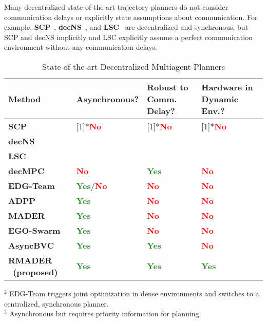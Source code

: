 Many decentralized state-of-the-art trajectory planners do not consider communication delays or explicitly state assumptions about communication. 
For example, \textbf{SCP}~\cite{chen_decoupled_2015}, \textbf{decNS}~\cite{liu_towards_2018}, and \textbf{LSC}~\cite{park_online_2022} are decentralized and synchronous, but SCP and decNS implicitly and LSC explicitly assume a perfect communication environment without any communication delays.

\newcommand{\NoRed}{\textbf{\textcolor{red}{No}}}
\newcommand{\YesGreen}{\textbf{\textcolor{ForestGreen}{Yes}}}

\begin{table}[!t]
    \renewcommand{\arraystretch}{1.2}
    \scriptsize
    \begin{centering}
    \caption{\centering State-of-the-art Decentralized Multiagent Planners}
    \label{tab:state_of_the_art_comparison}
    \begin{tabular}{>{\centering\arraybackslash}m{} >{\centering\arraybackslash}m{} >{\centering\arraybackslash}m{} >{\centering\arraybackslash}m{}}
    \toprule 
    \textbf{Method} & \textbf{Asynchronous?} & \textbf{Robust to Comm. Delay?} & \textbf{Hardware in Dynamic Env.?}\tabularnewline
    \hline 
    \hline 
    \textbf{SCP}~\cite{chen_decoupled_2015}  & \multirow{3}[1]{*}{\NoRed{}} & \multirow{3}[1]{*}{\NoRed{}} & \multirow{3}[1]{*}{\NoRed{}} \tabularnewline
    \cline{0-0}
    \textbf{decNS}~\cite{liu_towards_2018} &&& \tabularnewline
    \cline{0-0}
    \textbf{LSC}~\cite{park_online_2022} &&& \tabularnewline
    \hline 
    \textbf{decMPC}~\cite{toumieh_decentralized_2022} & \NoRed{} & \YesGreen{} & \NoRed{} \tabularnewline
    \hline
    \textbf{EDG-Team}~\cite{hou_enhanced_2022} & \YesGreen{}/\NoRed{}\footnotemark[2] & \NoRed{} & \NoRed{} \tabularnewline
    \hline 
    \textbf{ADPP}~\cite{cap_asynchronous_2013} & \YesGreen{}\footnotemark[3] & \NoRed{} & \NoRed{} \tabularnewline
    \hline
    \textbf{MADER}~\cite{tordesillas_mader_2022} & \YesGreen{} & \NoRed{} & \NoRed{} \tabularnewline
    \hline 
    \textbf{EGO-Swarm}~\cite{zhou_ego-swarm_2020} & \YesGreen{} & \NoRed{} & \NoRed{} \tabularnewline
    \hline 
    \textbf{AsyncBVC}~\cite{senbaslar_asynchronous_2022} & \YesGreen{} & \YesGreen{}  & \NoRed{} \tabularnewline
    \hline
    \textbf{RMADER \ (proposed)} & \YesGreen{} & \YesGreen{} & \YesGreen{} \tabularnewline
    \bottomrule
    \end{tabular}
    \par\end{centering}
\vspace*{0.5em}
\footnotesize{$^2$ \!\!\! EDG-Team triggers joint optimization in dense environments and switches to a centralized, synchronous planner.} \\
\footnotesize{$^3$  \!\!\!\! Asynchronous but requires priority information for planning.}
\vspace{-2em}
\end{table}

